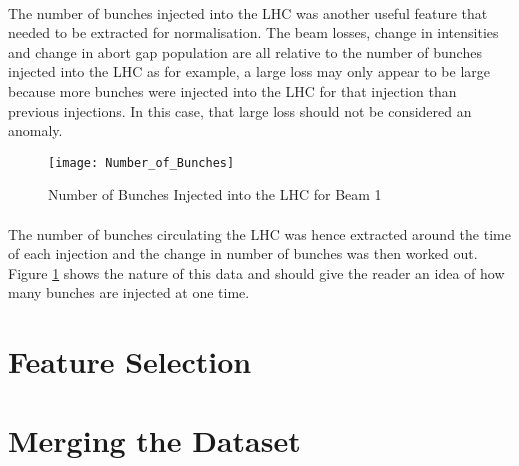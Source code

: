 \paragraph{ }The number of bunches injected into the \acs{LHC} was another useful feature that needed to be extracted for normalisation. The beam losses, change in intensities and change in abort gap population are all relative to the number of bunches injected into the \acs{LHC} as for example, a large loss may only appear to be large because more bunches were injected into the LHC for that injection than previous injections. In this case, that large loss should not be considered an anomaly. 

\begin{figure}[t]
	\centering
	\texttt{[image: Number\_of\_Bunches]}
	\caption[Number of Bunches]{Number of Bunches Injected into the LHC for Beam 1}
	\label{fig::Number_of_Bunches}
\end{figure} 

\paragraph{ }The number of bunches circulating the \acs{LHC} was hence extracted around the time of each injection and the change in number of bunches was then worked out. Figure \ref{fig::Number_of_Bunches} shows the nature of this data and should give the reader an idea of how many bunches are injected at one time.

\section{Feature Selection}


\section{Merging the Dataset}
\label{sec::Merging_the_Dataset}